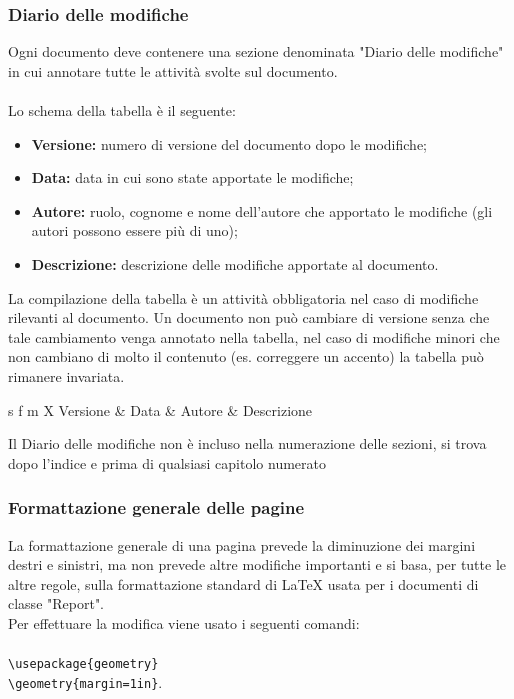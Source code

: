 \documentclass[a4paper]{article}
\begin{document}
		\subsubsection{Diario delle modifiche}
			Ogni documento deve contenere una sezione denominata "Diario delle modifiche" in cui annotare tutte le
			attività svolte sul documento.
			\\ \\
			Lo schema della tabella è il seguente:
			\begin{itemize}
				\item \textbf{Versione:} numero di versione del documento dopo le modifiche;
				\item \textbf{Data:} data in cui sono state apportate le modifiche;
				\item \textbf{Autore:} ruolo, cognome e nome dell'autore che apportato le modifiche (gli autori possono essere
				più di uno);
				\item \textbf{Descrizione:} descrizione delle modifiche apportate al documento.
			\end{itemize}
			La compilazione della tabella è un attività obbligatoria nel caso di modifiche rilevanti al documento. Un documento
			non può cambiare di versione senza che tale cambiamento venga annotato nella tabella, nel caso di modifiche
			minori che non cambiano di molto il contenuto (es. correggere un accento) la tabella può rimanere invariata.
			\begin{table}[H]
				\begin{tabularx}{\textwidth}{s f m X}
					 Versione & Data & Autore & Descrizione \\
				\end{tabularx}
				\caption{Schema del diario delle modifiche \label{tab:table_label}}
			\end{table}
			Il Diario delle modifiche non è incluso nella numerazione delle sezioni, si trova dopo l'indice e prima di qualsiasi
			 capitolo numerato
		\subsubsection{Formattazione generale delle pagine}
			La formattazione generale di una pagina prevede la diminuzione dei margini destri e sinistri, ma non prevede
			altre modifiche importanti e si basa, per tutte le altre regole, sulla formattazione standard di \LaTeX \space
			usata per i documenti di classe "Report".\\
			Per effettuare la modifica viene usato i seguenti comandi: \\ \\
			\verb|\usepackage{geometry}| \\ \verb|\geometry{margin=1in}|. \\
\end{document}
